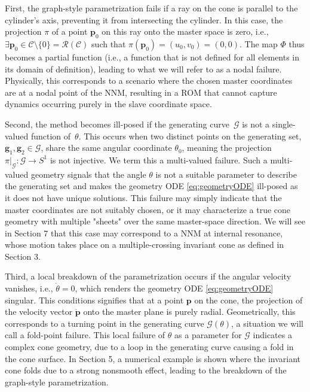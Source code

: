 \documentclass[a4paper,9pt,parskip=half,english]{article}
\theoremstyle{plain}
\theoremstyle{definition}
\newcommand{\vg}{\mathbf g}
\newcommand{\vp}{\mathbf p}
\newcommand{\cG}{\mathcal{G}}
\begin{document}
First, the graph-style parametrization fails if a ray on the cone is parallel to the cylinder's axis, preventing it from intersecting the cylinder. In this case, the projection $\pi$ of a point $\vp_0$ on this ray onto the master space is zero, i.e., $\exists \vp_0 \in \mathcal{C} \setminus \{0\} = \mathcal{R}(\mathcal{C})$ such that $\pi(\vp_0) = (u_0, v_0) = (0,0)$. The map $\Phi$ thus becomes a partial function (i.e., a function that is not defined for all elements in its domain of definition), leading to what we will refer to as a nodal failure. Physically, this corresponds to a scenario where the chosen master coordinates are at a nodal point of the NNM, resulting in a ROM that cannot capture dynamics occurring purely in the slave coordinate space. 

Second, the method becomes ill-posed if the generating curve~$\cG$ is not a single-valued function of~$\theta$. This occurs when two distinct points on the generating set, $\vg_1, \vg_2 \in \mathcal{G}$, share the same angular coordinate $\theta_0$, meaning the projection $\pi|_{\mathcal{G}}: \mathcal{G} \to S^1$ is not injective. We term this a multi-valued failure. Such a multi-valued geometry signals that the angle $\theta$ is not a suitable parameter to describe the generating set and makes the geometry ODE \eqref{eq:geometryODE} ill-posed as it does not have unique solutions. This failure may simply indicate that the master coordinates are not suitably chosen, or it may characterize a true cone geometry with multiple "sheets" over the same master-space direction. We will see in Section 7 that this case may correspond to a NNM at internal resonance, whose motion takes place on a multiple-crossing invariant cone as defined in Section 3. 

Third, a local breakdown of the parametrization occurs if the angular velocity vanishes, i.e., $\dot{\theta}=0$, which renders the geometry ODE \eqref{eq:geometryODE} singular. This conditions signifies that at a point $\vp$ on the cone, the projection of the velocity vector $\dot{\vp}$ onto the master plane is purely radial. Geometrically, this corresponds to a turning point in the generating curve $\mathcal{G}(\theta)$, a situation we will call a fold-point failure. This local failure of $\theta$ as a parameter for $\cG$ indicates a complex cone geometry, due to a loop in the generating curve causing a fold in the cone surface. In Section 5, a numerical example is shown where the invariant cone folds due to a strong nonsmooth effect, leading to the breakdown of the graph-style parametrization.
\end{document}
